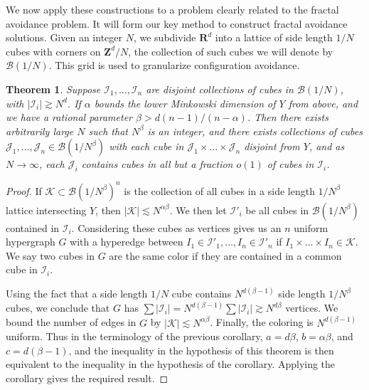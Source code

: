 \documentclass{article}
\theoremstyle{plain}
\theoremstyle{plain}
\newtheorem{theorem}{Theorem}
\begin{document}
\begin{multicols}{2}
We now apply these constructions to a problem clearly related to the fractal avoidance problem. It will form our key method to construct fractal avoidance solutions. Given an integer $N$, we subdivide $\mathbf{R}^d$ into a lattice of side length $1/N$ cubes with corners on $\mathbf{Z}^d/N$, the collection of such cubes we will denote by $\mathcal{B}(1/N)$. This grid is used to granularize configuration avoidance.

\begin{theorem}
	Suppose $\mathcal{I}_1, \dots, \mathcal{I}_n$ are disjoint collections of cubes in $\mathcal{B}(1/N)$, with $|\mathcal{I}_i| \gtrsim N^d$. If $\alpha$ bounds the lower Minkowski dimension of $Y$ from above, and we have a rational parameter $\beta > d(n-1)/(n-\alpha)$. Then there exists arbitrarily large $N$ such that $N^\beta$ is an integer, and there exists collections of cubes $\mathcal{J}_1, \dots, \mathcal{J}_n \in \mathcal{B}(1/N^\beta)$ with each cube in $\mathcal{J}_1 \times \dots \times \mathcal{J}_n$ disjoint from $Y$, and as $N \to \infty$, each $\mathcal{J}_i$ contains cubes in all but a fraction $o(1)$ of cubes in $\mathcal{I}_i$.
\end{theorem}
\begin{proof}
	If $\mathcal{K} \subset \mathcal{B}(1/N^\beta)^n$ is the collection of all cubes in a side length $1/N^\beta$ lattice intersecting $Y$, then $|\mathcal{K}| \lesssim N^{\alpha \beta}$. We then let $\mathcal{I}'_i$ be all cubes in $\mathcal{B}(1/N^\beta)$ contained in $\mathcal{I}_i$. Considering these cubes as vertices gives us an $n$ uniform hypergraph $G$ with a hyperedge between $I_1 \in \mathcal{I}'_1, \dots, I_n \in \mathcal{I}'_n$ if $I_1 \times \dots \times I_n \in \mathcal{K}$. We say two cubes in $G$ are the same color if they are contained in a common cube in $\mathcal{I}_i$.

	Using the fact that a side length $1/N$ cube contains $N^{d(\beta - 1)}$ side length $1/N^\beta$ cubes, we conclude that $G$ has $\sum |\mathcal{I}_i| = N^{d(\beta - 1)} \sum |\mathcal{I}_i| \gtrsim N^{d \beta}$ vertices. We bound the number of edges in $G$ by $|\mathcal{K}| \lesssim N^{\alpha \beta}$. Finally, the coloring is $N^{d(\beta - 1)}$ uniform. Thus in the terminology of the previous corollary, $a = d \beta$, $b = \alpha \beta$, and $c = d(\beta - 1)$, and the inequality in the hypothesis of this theorem is then equivalent to the inequality in the hypothesis of the corollary. Applying the corollary gives the required result.
\end{proof}


\end{multicols}
\end{document}
